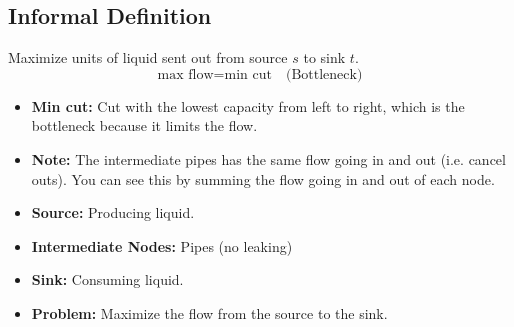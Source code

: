 \subsection{Informal Definition}
\begin{definition}
    Maximize units of liquid sent out from source $s$ to sink $t$. 
    \[
    \text{max flow} = \text{min cut} \quad \text{(Bottleneck)}
    \]
    \begin{itemize}
        \item \textbf{Min cut:} Cut with the lowest capacity from left to right, which is the bottleneck because it limits the flow.
    \end{itemize}

\begin{itemize}
    \item \textbf{Note:} The intermediate pipes has the same flow going in and out (i.e. cancel outs). You can see this by summing the flow going in and out of each node.
\end{itemize}
\end{definition}

\begin{intuition}
    \begin{itemize}
        \item \textbf{Source:} Producing liquid. 
        \item \textbf{Intermediate Nodes:} Pipes (no leaking)
        \item \textbf{Sink:} Consuming liquid.
        \item \textbf{Problem:}  Maximize the flow from the source to the sink.
    \end{itemize}
\end{intuition}

